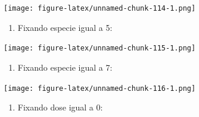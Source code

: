 \documentclass[
]{article}
\newenvironment{Shaded}{\begin{snugshade}}{\end{snugshade}}
\newcommand{\DataTypeTok}[1]{\textcolor[rgb]{0.13,0.29,0.53}{#1}}
\newcommand{\DecValTok}[1]{\textcolor[rgb]{0.00,0.00,0.81}{#1}}
\newcommand{\KeywordTok}[1]{\textcolor[rgb]{0.13,0.29,0.53}{\textbf{#1}}}
\newcommand{\NormalTok}[1]{#1}
\newcommand{\OperatorTok}[1]{\textcolor[rgb]{0.81,0.36,0.00}{\textbf{#1}}}
\newcommand{\StringTok}[1]{\textcolor[rgb]{0.31,0.60,0.02}{#1}}
\providecommand{\tightlist}{%
  \setlength{\itemsep}{0pt}\setlength{\parskip}{0pt}}
\begin{document}
\texttt{[image: figure-latex/unnamed-chunk-114-1.png]}

\begin{enumerate}
\def\labelenumi{\arabic{enumi}.}
\setcounter{enumi}{5}
\tightlist
\item
  Fixando especie igual a 5:
\end{enumerate}

\begin{Shaded}
\end{Shaded}

\texttt{[image: figure-latex/unnamed-chunk-115-1.png]}

\begin{enumerate}
\def\labelenumi{\arabic{enumi}.}
\setcounter{enumi}{6}
\tightlist
\item
  Fixando especie igual a 7:
\end{enumerate}

\begin{Shaded}
\end{Shaded}

\texttt{[image: figure-latex/unnamed-chunk-116-1.png]}

\begin{enumerate}
\def\labelenumi{\arabic{enumi}.}
\setcounter{enumi}{7}
\tightlist
\item
  Fixando dose igual a 0:
\end{enumerate}

\begin{Shaded}
\end{Shaded}
\end{document}
